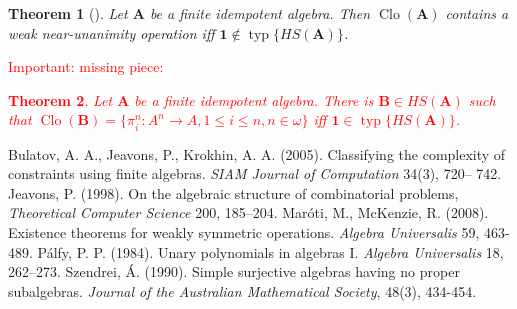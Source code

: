 \documentclass{amsart}
\theoremstyle{plain}
\newtheorem{theorem}{Theorem}[section]
\theoremstyle{definition}
\theoremstyle{remark}
\DeclareMathOperator{\Clo}{Clo}
\DeclareMathOperator{\typ}{typ}
\begin{document}
\begin{theorem}
    [\cite{wnu}]
    Let $\mathbf{A}$ be a finite idempotent algebra. 
    Then $\Clo(\mathbf{A})$ contains a weak near-unanimity operation iff $\mathbf{1} \notin \typ\{HS(\mathbf{A})\}$. 
\end{theorem}

\textcolor{red}{Important: missing piece: 
\begin{theorem}
    Let $\mathbf{A}$ be a finite idempotent algebra. 
    There is $\mathbf{B} \in HS(\mathbf{A})$ such that $\Clo(\mathbf{B})=\{\pi^n_i: A^n \to A, 1 \le i \le n, n \in \omega\}$ iff $\mathbf{1} \in \typ\{HS(\mathbf{A})\}$. 
\end{theorem}
}

\begin{thebibliography}{9}
    Bulatov, A. A.,  Jeavons, P., Krokhin, A. A. (2005). Classifying the complexity of constraints using finite algebras. \emph{SIAM Journal of Computation} 34(3), 720– 742.
    Jeavons, P. (1998). On the algebraic structure of combinatorial problems, \emph{Theoretical Computer Science} 200, 185–204.
    Mar\'oti, M., McKenzie, R. (2008). Existence theorems for weakly symmetric operations. \emph{Algebra Universalis} 59, 463-489.
    P\'alfy, P. P. (1984). Unary polynomials in algebras I. \emph{Algebra Universalis} 18, 262–273.
    Szendrei, Á. (1990). Simple surjective algebras having no proper subalgebras. \emph{Journal of the Australian Mathematical Society}, 48(3), 434-454. 
 \end{thebibliography}
\end{document}
